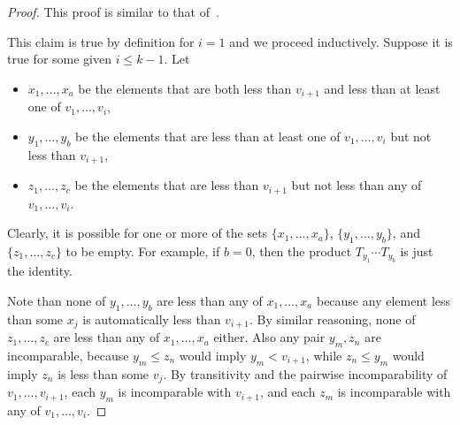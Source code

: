 \documentclass[10pt]{amsart}
\theoremstyle{definition}
\begin{document}
\begin{proof}
This proof is similar to that of~\cite[Lemma 2.21]{antichain-toggling}.

This claim is true by definition for $i=1$ and we proceed inductively. Suppose it is true for some given $i\leq k-1$. Let
\begin{itemize}
\item $x_1,\dots,x_a$ be the elements that are both less than $v_{i+1}$ and less than at least one of $v_1,\dots,v_i$,
\item $y_1,\dots,y_b$ be the elements that are less than at least one of $v_1,\dots,v_i$ but not less than $v_{i+1}$,
\item $z_1,\dots,z_c$ be the elements that are less than $v_{i+1}$ but not less than any of $v_1,\dots,v_i$.
\end{itemize}
Clearly, it is possible for one or more of the sets $\{x_1,\dots,x_a\}$, $\{y_1,\dots,y_b\}$, and $\{z_1,\dots,z_c\}$ to be empty. For example, if $b=0$, then the product $T_{y_1}\cdots T_{y_b}$ is just the identity.

Note than none of $y_1,\dots,y_b$ are less than any of $x_1,\dots,x_a$ because any element less than some $x_j$ is automatically less than $v_{i+1}$. By similar reasoning, none of $z_1,\dots,z_c$ are less than any of $x_1,\dots,x_a$ either.
Also any pair $y_m,z_n$ are incomparable, because $y_m \leq z_n$ would imply $y_m<v_{i+1}$, while $z_n \leq y_m$ would imply $z_n$ is less than some $v_j$.
By transitivity and the pairwise incomparability of $v_1,\dots,v_{i+1}$, each $y_m$ is incomparable with $v_{i+1}$, and each $z_m$ is incomparable with any of $v_1,\dots,v_i$.


\end{proof}
\end{document}

